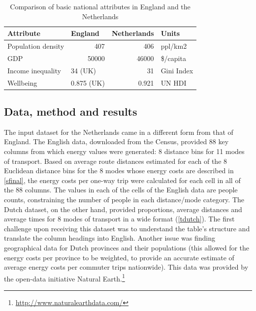 \documentclass[a4paper, 11pt, twoside]{Thesis}
\begin{document}
\begin{table}[htbp]
\caption{Comparison of basic national attributes in England and the Netherlands}
\begin{center}
\begin{tabular}{llrl}
\toprule
Attribute & England & \multicolumn{1}{l}{Netherlands } & Units \\
\midrule
Population density & \multicolumn{1}{r}{407} & 406 & ppl/km2 \\
GDP & \multicolumn{1}{r}{50000} & 46000 & \$/capita \\
Income inequality & 34 (UK) & 31 & Gini Index \\
Wellbeing & 0.875 (UK) & 0.921 & UN HDI \\
\bottomrule
\end{tabular}\end{center}
\label{tcompare}
\end{table}

\subsection{Data, method and results} \label{sdutchdata}
The input dataset for the Netherlands came in a different form from
that of England. The English data, downloaded from the Census,
provided 88 key columns from which energy values were generated:
8 distance bins for 11 modes of transport. Based on average route distances
estimated for each of the 8 Euclidean distance bins for the 8 modes whose
energy costs are described in \cref{sfinal}, the energy costs per one-way
trip were calculated for each cell in all of the 88 columns. The values in
each of the cells of the English data are people counts, constraining the
number of people in each distance/mode category.
The Dutch dataset, on the other hand, provided proportions, average distances
and average times for 8 modes of transport in a wide format (\cref{tdutch}).
The first challenge upon receiving this dataset was to understand the
table's structure and translate the column headings into English.
Another issue was finding geographical data for Dutch provinces and their
populations (this allowed for the energy costs per province to be weighted,
to provide an accurate estimate of average energy costs per commuter trips
nationwide). This data was provided by the open-data initiative
Natural Earth.\footnote{\href{http://www.naturalearthdata.com/}
{http://www.naturalearthdata.com/}
}
\end{document}
